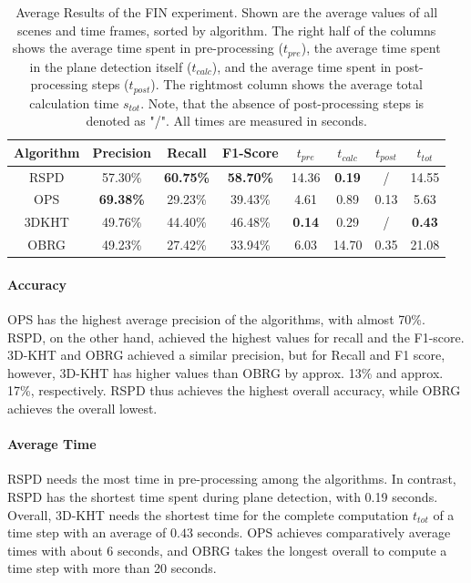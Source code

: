 \documentclass[main.tex]{subfiles}
\begin{document}
\begin{table}[H]
    \centering
    \begin{tabular}{c|cccccc|c}
        Algorithm & Precision        & Recall           & F1-Score         & $t_{pre}$     & $t_{calc}$    & $t_{post}$ & $t_{tot}$     \\ \hline
        RSPD      & 57.30\%          & \textbf{60.75\%} & \textbf{58.70\%} & 14.36         & \textbf{0.19} & /          & 14.55         \\
        OPS       & \textbf{69.38\%} & 29.23\%          & 39.43\%          & 4.61          & 0.89          & 0.13       & 5.63          \\
        3DKHT     & 49.76\%          & 44.40\%          & 46.48\%          & \textbf{0.14} & 0.29          & /          & \textbf{0.43} \\
        OBRG      & 49.23\%          & 27.42\%          & 33.94\%          & 6.03          & 14.70         & 0.35       & 21.08
    \end{tabular}
    \caption[Average FIN Results]{Average Results of the FIN experiment. Shown are the average values of all scenes and time frames, sorted by
        algorithm. The right half of the columns shows the average time spent in pre-processing ($t_{pre}$), the average time spent in the plane
        detection itself ($t_{calc}$), and the average time spent in post-processing steps ($t_{post}$).
        The rightmost column shows the average total calculation time $s_{tot}$.
        Note, that the absence of post-processing steps is denoted as "/".
        All times are measured in seconds.}
    \label{tab:res-fin-total}
\end{table}

\paragraph{Accuracy}
OPS has the highest average precision of the algorithms, with almost 70\%. RSPD, on the other hand, achieved the highest values
for recall and the F1-score. 3D-KHT and OBRG achieved a similar precision, but for Recall and F1 score, however, 3D-KHT has
higher values than OBRG by approx. 13\% and approx. 17\%, respectively. RSPD thus achieves the highest overall accuracy,
while OBRG achieves the overall lowest.


\paragraph{Average Time}
RSPD needs the most time in pre-processing among the algorithms. In contrast, RSPD has the shortest time spent
during plane detection, with 0.19 seconds. Overall, 3D-KHT needs the shortest time for the complete computation $t_{tot}$
of a time step with an average of $0.43$ seconds. OPS achieves comparatively average times with about 6 seconds, and OBRG
takes the longest overall to compute a time step with more than 20 seconds.
\end{document}
